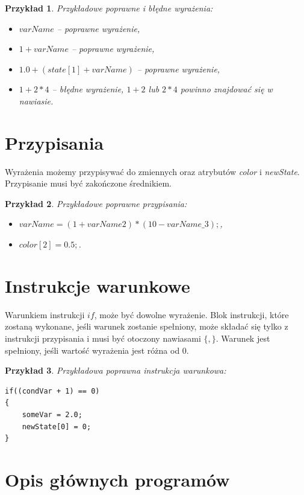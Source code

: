 \documentclass[declaration,shortabstract, inz]{iithesis}
\theoremstyle{definition} \newtheorem{definition}{Definicja}[]
\theoremstyle{plain} \newtheorem{remark}[definition]{Obserwacja}
\theoremstyle{plain} \newtheorem{theorem}[definition]{Twierdzenie}
\theoremstyle{plain} \newtheorem{example}{Przykład}[definition]
\theoremstyle{plain} \newtheorem{lemma}[definition]{Lemat}
\begin{document}
\begin{example}
Przykładowe poprawne i błędne wyrażenia:
\begin{itemize}
\item $varName$ -- poprawne wyrażenie,
\item $1 + varName$ -- poprawne wyrażenie,
\item $1.0 + (state[1] + varName)$ -- poprawne wyrażenie,
\item $1 + 2 * 4$ -- błędne wyrażenie, $1 + 2$ lub $2 * 4$ powinno znajdować się w nawiasie.
\end{itemize}
\end{example}

\section{Przypisania}
Wyrażenia możemy przypisywać do zmiennych oraz atrybutów \textit{color} i \textit{newState}. Przypisanie musi być zakończone średnikiem.

\begin{example}
Przykładowe poprawne przypisania:
\begin{itemize}
\item $varName = (1 + varName2) * (10 - varName\_3);$,
\item $color[2] = 0.5;$.
\end{itemize}
\end{example}

\section{Instrukcje warunkowe}
Warunkiem instrukcji $if$, może być dowolne wyrażenie. Blok instrukcji, które zostaną wykonane, jeśli warunek zostanie spełniony, może składać się tylko z instrukcji przypisania i musi być otoczony nawiasami $\{, \}$. Warunek jest spełniony, jeśli wartość wyrażenia jest różna od $0$.

\begin{example}
Przykładowa poprawna instrukcja warunkowa:
\begin{center}
\begin{lstlisting}
if((condVar + 1) == 0)
{
	someVar = 2.0;
	newState[0] = 0;
}
\end{lstlisting}
\end{center}
\end{example}

\section{Opis głównych programów}
\end{document}
